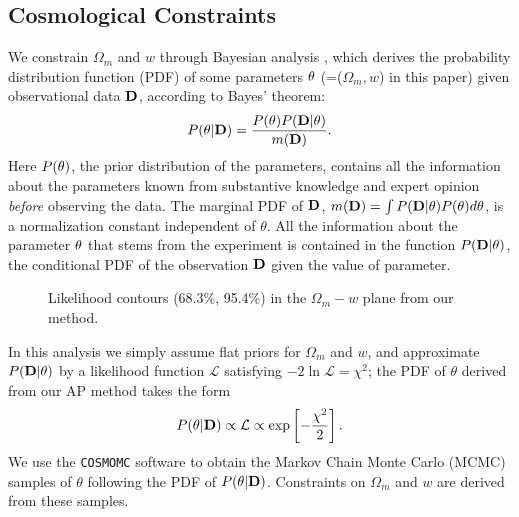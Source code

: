 \documentclass[iop]{emulateapj}
\begin{document}




\subsection{Cosmological Constraints}


We constrain $\Omega_m$ and $w$ through Bayesian analysis \citep{Bayesian},
which derives the probability distribution function (PDF) of some parameters $\bf \theta$ (=($\Omega_m,w$) in this paper)
given observational data $\bf D$, 
according to Bayes' theorem:
\begin{equation}
 P({\bf \theta}|{\bf D}) = \frac{P({\bf \theta})P({\bf D}|{\bf \theta})}{m({\bf D})}.
\end{equation}
Here $P(\bf \theta)$, the prior distribution of the parameters,
contains all the information about the parameters known from substantive knowledge 
and expert opinion {\it before} observing the data.
The marginal PDF of $\bf D$, 
$m({\bf D})=\int P({\bf D|\theta})P({\bf \theta})d{\bf \theta}$, 
is a normalization constant independent of $\theta$.
All the information about the parameter $\bf \theta$ that stems from the experiment
is contained in the function $P({\bf D}|{\bf \theta})$, 
the conditional PDF of the observation $\bf D$ given the value of parameter.

\begin{figure}
   \centering{
   }
   \caption{\label{fig}
   Likelihood contours (68.3\%, 95.4\%) in the $\Omega_m-w$ plane from our method.
   }
\end{figure}

In this analysis we simply assume flat priors for $\Omega_m$ and $w$,
and approximate $P({\bf D}|{\bf \theta})$ by a likelihood function $\mathcal{L}$
satisfying  $-2 \ln \mathcal{L}=\chi^2$;
the PDF of $\theta$ derived from our AP method takes the form
\begin{equation}
 P({\bf \theta}|{\bf D}) \propto \mathcal{L} \propto \exp\left[-\frac{\chi^2}{2}\right].
\end{equation}
We use the {\texttt {COSMOMC}} software \citep{LB2002}
to obtain the Markov Chain Monte Carlo (MCMC) samples of $\theta$ following the PDF of $P({\bf \theta}|{\bf D})$.
Constraints on $\Omega_m$ and $w$ are derived from these samples.
\end{document}

